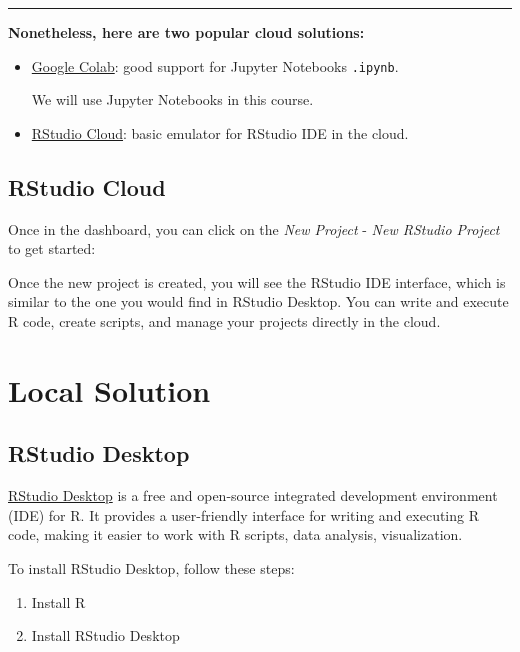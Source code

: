 \documentclass[
  12pt,
  letterpaper,
]{scrbook}
\providecommand{\tightlist}{%
  \setlength{\itemsep}{0pt}\setlength{\parskip}{0pt}}
\renewcommand{\tightlist}{\setlength{\itemsep}{0.5\baselineskip}\setlength{\parskip}{0.2\baselineskip}}
\theoremstyle{plain}
\theoremstyle{definition}
\theoremstyle{remark}
\begin{document}
\begin{center}\rule{0.5\linewidth}{0.5pt}\end{center}

\textbf{Nonetheless, here are two popular cloud solutions:}

\begin{itemize}
\item
  \href{https://colab.research.google.com/}{Google Colab}: good support
  for Jupyter Notebooks \texttt{.ipynb}.

  We will use Jupyter Notebooks in this course.
\item
  \href{https://rstudio.cloud/}{RStudio Cloud}: basic emulator for
  RStudio IDE in the cloud.
\end{itemize}

\subsection{RStudio Cloud}\label{rstudio-cloud}

Once in the dashboard, you can click on the \emph{New Project} -
\emph{New RStudio Project} to get started:

Once the new project is created, you will see the RStudio IDE interface,
which is similar to the one you would find in RStudio Desktop. You can
write and execute R code, create scripts, and manage your projects
directly in the cloud.

\section{Local Solution}\label{local-solution}

\subsection{RStudio Desktop}\label{RStudio-Desktop}

\href{https://posit.co/download/rstudio-desktop/}{RStudio Desktop} is a
free and open-source integrated development environment (IDE) for R. It
provides a user-friendly interface for writing and executing R code,
making it easier to work with R scripts, data analysis, visualization.

To install RStudio Desktop, follow these steps:

\begin{enumerate}
\def\labelenumi{\arabic{enumi}.}
\tightlist
\item
  Install R
\item
  Install RStudio Desktop
\end{enumerate}
\end{document}
